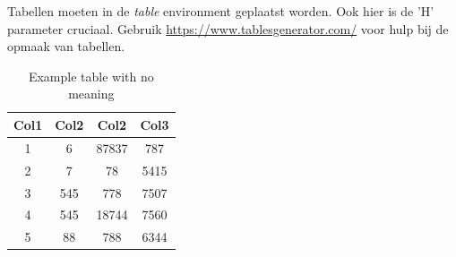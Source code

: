 Tabellen moeten in de \textit{table} environment geplaatst worden.
Ook hier is de 'H' parameter cruciaal.
Gebruik \url{https://www.tablesgenerator.com/} voor hulp bij de opmaak van tabellen.

\begin{table}[!htpb]
\centering
    \label{tab:example_table}
    \caption{Example table with no meaning}
    \begin{tabular}{||c c c c||} 
    \hline
    Col1 & Col2 & Col2 & Col3 \\ [0.5ex] 
    \hline\hline
    1 & 6 & 87837 & 787 \\ 
    2 & 7 & 78 & 5415 \\
    3 & 545 & 778 & 7507 \\
    4 & 545 & 18744 & 7560 \\
    5 & 88 & 788 & 6344 \\ [1ex] 
    \hline
    \end{tabular}
\end{table}